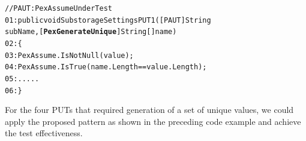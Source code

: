 \begin{CodeOut}
\begin{alltt}
//PAUT: PexAssumeUnderTest
01: public void SubstorageSettingsPUT1([PAUT]String 
\hspace*{0.3in}subName, [\textbf{PexGenerateUnique}]String[] name)
02:\{
03:\hspace*{0.3in}PexAssume.IsNotNull(value); 
04:\hspace*{0.3in}PexAssume.IsTrue(name.Length == value.Length);
05:\hspace*{0.1in}.....
06:\}
\end{alltt}
\end{CodeOut}

For the four PUTs that required generation of a set of unique values, we could apply the proposed pattern as shown in the preceding code example and achieve the test effectiveness.
